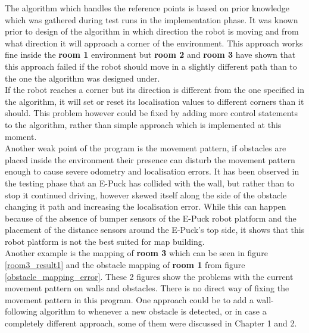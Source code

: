 The algorithm which handles the reference points is based on prior knowledge which was gathered during test runs in the implementation phase. It was known prior to design of the algorithm in which direction the robot is moving and from what direction it will approach a corner of the environment. This approach works fine inside the \textbf{room 1} environment but \textbf{room 2} and \textbf{room 3} have shown that this approach failed if the robot should move in a slightly different path than to the one the algorithm was designed under. \\
If the robot reaches a corner but its direction is different from the one specified in the algorithm, it will set or reset its localisation values to different corners than it should. This problem however could be fixed by adding more control statements to the algorithm, rather than simple approach which is implemented at this moment. \\[3ex]

Another weak point of the program is the movement pattern, if obstacles are placed inside the environment their presence can disturb the movement pattern enough to cause severe odometry and localisation errors. It has been observed in the testing phase that an E-Puck has collided with the wall, but rather than to stop it continued driving, however skewed itself along the side of the obstacle changing it path and increasing the localisation error. While this can happen because of the absence of bumper sensors of the E-Puck robot platform and the placement of the distance sensors around the E-Puck's top side, it shows that this robot platform is not the best suited for map building.\\
Another example is the mapping of \textbf{room 3 }which can be seen in figure \ref{room3_result1} and the obstacle mapping of \textbf{room 1} from figure \ref{obstacle_mapping_error}. These 2 figures show the problems with the current movement pattern on walls and obstacles. There is no direct way of fixing the movement pattern in this program. One approach could be to add a wall-following algorithm to whenever a new obstacle is detected, or in case a completely different approach, some of them were discussed in Chapter 1 and 2. \\[3ex]


